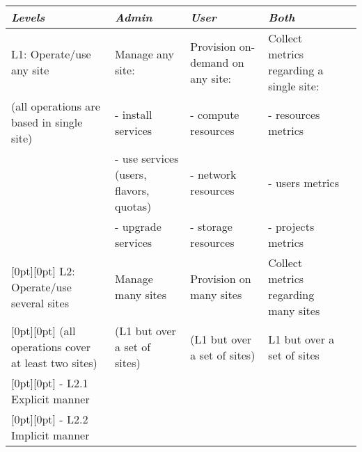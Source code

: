 
  \scriptsize
  \begin{tabular}{@{} l L L L @{} >{\kern\tabcolsep}l @{}}    \toprule

    \emph{Levels} & \emph{Admin}& \emph{User} & \emph{Both} \\\midrule

    L1: Operate/use any site &
    Manage any site: &
    Provision on-demand on any site: &
    Collect metrics regarding a single site: \\ 

    (all operations are based in single site) &
    - install services &
    - compute resources&
    - resources metrics \\

    &
    - use services (users, flavors, quotas)&
    - network resources&
    - users metrics\\

    &
    - upgrade services&
    - storage resources&
    - projects metrics \\

    [0pt][0pt]
    L2: Operate/use several sites &
    Manage many sites &
    Provision on many sites &
    Collect metrics regarding many sites\\

    [0pt][0pt]
    (all operations cover at least two sites) &
    (L1 but over a set of sites)&
    (L1 but over a set of sites)&
    L1 but over a set of sites \\

    [0pt][0pt]
    - L2.1 Explicit manner&
    &
    &
    \\
    
    [0pt][0pt]
    - L2.2 Implicit manner&
    &
    &
    \\


\end{tabular}
